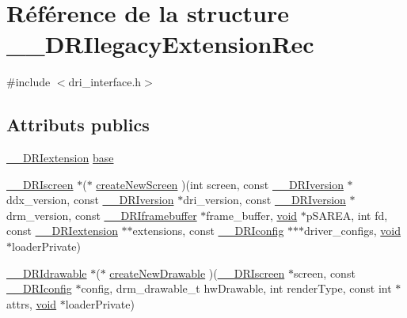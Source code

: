 \hypertarget{struct_____d_r_ilegacy_extension_rec}{\section{Référence de la structure \-\_\-\-\_\-\-D\-R\-Ilegacy\-Extension\-Rec}
\label{struct_____d_r_ilegacy_extension_rec}
}


{\ttfamily \#include $<$dri\-\_\-interface.\-h$>$}

\subsection*{Attributs publics}
\begin{DoxyCompactItemize}
\item 
\hyperlink{dri__interface_8h_a4e0a61c8ece00d2b2c6792a9a1b55385}{\-\_\-\-\_\-\-D\-R\-Iextension} \hyperlink{struct_____d_r_ilegacy_extension_rec_a03e6696cc6f5377d4a4ae731f25cfd2d}{base}
\item 
\hyperlink{dri__interface_8h_a9961b01d421ee1fd6ed3c05acc9ca561}{\-\_\-\-\_\-\-D\-R\-Iscreen} $\ast$($\ast$ \hyperlink{struct_____d_r_ilegacy_extension_rec_afe09eb004b0a0a6f3ce2aebcaff84f9a}{create\-New\-Screen} )(int screen, const \hyperlink{dri__interface_8h_a824c6134dbdbbf2f62c2c6a44fcbdf02}{\-\_\-\-\_\-\-D\-R\-Iversion} $\ast$ddx\-\_\-version, const \hyperlink{dri__interface_8h_a824c6134dbdbbf2f62c2c6a44fcbdf02}{\-\_\-\-\_\-\-D\-R\-Iversion} $\ast$dri\-\_\-version, const \hyperlink{dri__interface_8h_a824c6134dbdbbf2f62c2c6a44fcbdf02}{\-\_\-\-\_\-\-D\-R\-Iversion} $\ast$drm\-\_\-version, const \hyperlink{dri__interface_8h_a8cb888e603d44eef2287cacd07fc5e2c}{\-\_\-\-\_\-\-D\-R\-Iframebuffer} $\ast$frame\-\_\-buffer, \hyperlink{glu_8h_a4292190e3f1f6b373a760c7d9316ad3c}{void} $\ast$p\-S\-A\-R\-E\-A, int fd, const \hyperlink{dri__interface_8h_a4e0a61c8ece00d2b2c6792a9a1b55385}{\-\_\-\-\_\-\-D\-R\-Iextension} $\ast$$\ast$extensions, const \hyperlink{dri__interface_8h_aeac81999efbbf8b1d6886338e3ea24d9}{\-\_\-\-\_\-\-D\-R\-Iconfig} $\ast$$\ast$$\ast$driver\-\_\-configs, \hyperlink{glu_8h_a4292190e3f1f6b373a760c7d9316ad3c}{void} $\ast$loader\-Private)
\item 
\hyperlink{dri__interface_8h_a5bfb832a0a08208d95b3bbef439d2262}{\-\_\-\-\_\-\-D\-R\-Idrawable} $\ast$($\ast$ \hyperlink{struct_____d_r_ilegacy_extension_rec_a0d72393303d6f5af46b2ea23333d68e8}{create\-New\-Drawable} )(\hyperlink{dri__interface_8h_a9961b01d421ee1fd6ed3c05acc9ca561}{\-\_\-\-\_\-\-D\-R\-Iscreen} $\ast$screen, const \hyperlink{dri__interface_8h_aeac81999efbbf8b1d6886338e3ea24d9}{\-\_\-\-\_\-\-D\-R\-Iconfig} $\ast$config, drm\-\_\-drawable\-\_\-t hw\-Drawable, int render\-Type, const int $\ast$attrs, \hyperlink{glu_8h_a4292190e3f1f6b373a760c7d9316ad3c}{void} $\ast$loader\-Private)
$$
\end{DoxyCompactItemize}
